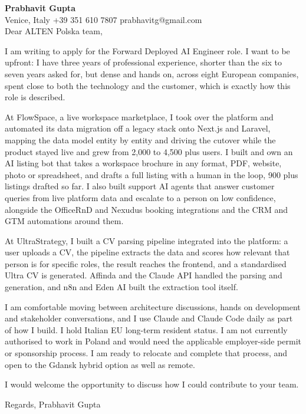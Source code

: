 \documentclass[a4paper,10.5pt]{article}
\begin{document}
\textbf{Prabhavit Gupta}\\
Venice, Italy \textbar{} +39 351 610 7807 \textbar{} prabhavitg@gmail.com\\[10pt]
Dear ALTEN Polska team,

I am writing to apply for the Forward Deployed AI Engineer role. I want to be upfront: I have three years of professional experience, shorter than the six to seven years asked for, but dense and hands on, across eight European companies, spent close to both the technology and the customer, which is exactly how this role is described.

At FlowSpace, a live workspace marketplace, I took over the platform and automated its data migration off a legacy stack onto Next.js and Laravel, mapping the data model entity by entity and driving the cutover while the product stayed live and grew from 2,000 to 4,500 plus users. I built and own an AI listing bot that takes a workspace brochure in any format, PDF, website, photo or spreadsheet, and drafts a full listing with a human in the loop, 900 plus listings drafted so far. I also built support AI agents that answer customer queries from live platform data and escalate to a person on low confidence, alongside the OfficeRnD and Nexudus booking integrations and the CRM and GTM automations around them.

At UltraStrategy, I built a CV parsing pipeline integrated into the platform: a user uploads a CV, the pipeline extracts the data and scores how relevant that person is for specific roles, the result reaches the frontend, and a standardised Ultra CV is generated. Affinda and the Claude API handled the parsing and generation, and n8n and Eden AI built the extraction tool itself.

I am comfortable moving between architecture discussions, hands on development and stakeholder conversations, and I use Claude and Claude Code daily as part of how I build. I hold Italian EU long-term resident status. I am not currently authorised to work in Poland and would need the applicable employer-side permit or sponsorship process. I am ready to relocate and complete that process, and open to the Gdansk hybrid option as well as remote.

I would welcome the opportunity to discuss how I could contribute to your team.

Regards,
Prabhavit Gupta
\end{document}
